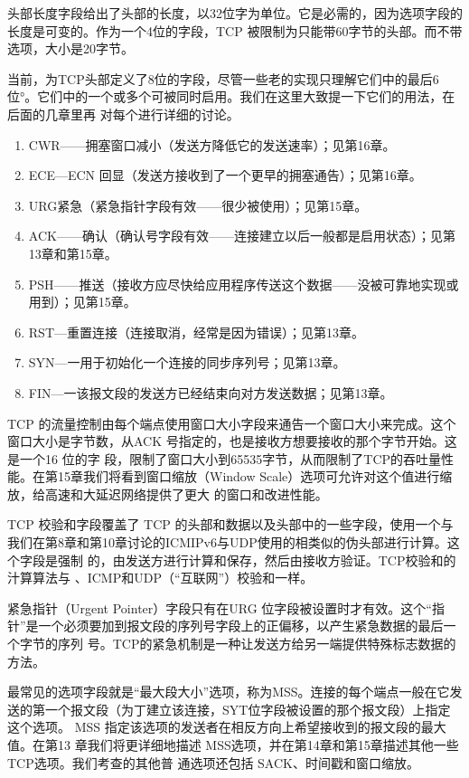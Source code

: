 头部长度字段给出了头部的长度，以32位字为单位。它是必需的，因为选项字段的长度是可变的。作为一个4位的字段，TCP 被限制为只能带60字节的头部。而不带选项，大小是20字节。

当前，为TCP头部定义了8位的字段，尽管一些老的实现只理解它们中的最后6位°。它们中的一个或多个可被同时启用。我们在这里大致提一下它们的用法，在后面的几章里再
对每个进行详细的讨论。

\begin{enumerate}
    \item CWR——拥塞窗口减小（发送方降低它的发送速率）；见第16章。
    \item ECE—ECN 回显（发送方接收到了一个更早的拥塞通告）；见第16章。
    \item URG紧急（紧急指针字段有效——很少被使用）；见第15章。
    \item ACK——确认（确认号字段有效——连接建立以后一般都是启用状态）；见第13章和第15章。
    \item PSH——推送（接收方应尽快给应用程序传送这个数据——没被可靠地实现或用到）；见第15章。
    \item RST—重置连接（连接取消，经常是因为错误）；见第13章。
    \item SYN—一用于初始化一个连接的同步序列号；见第13章。
    \item FIN—一该报文段的发送方已经结束向对方发送数据；见第13章。
\end{enumerate}
TCP 的流量控制由每个端点使用窗口大小字段来通告一个窗口大小来完成。这个窗口大小是字节数，从ACK 号指定的，也是接收方想要接收的那个字节开始。这是一个16 位的字
段，限制了窗口大小到65535字节，从而限制了TCP的吞吐量性能。在第15章我们将看到窗口缩放（Window Scale）选项可允许对这个值进行缩放，给高速和大延迟网络提供了更大
的窗口和改进性能。

TCP 校验和字段覆盖了 TCP 的头部和数据以及头部中的一些字段，使用一个与我们在第8章和第10章讨论的ICMIPv6与UDP使用的相类似的伪头部进行计算。这个字段是强制
的，由发送方进行计算和保存，然后由接收方验证。TCP校验和的汁算算法与 、ICMP和UDP（“互联网”）校验和一样。

紧急指针（Urgent Pointer）字段只有在URG 位字段被设置时才有效。这个“指针”是一个必须要加到报文段的序列号字段上的正偏移，以产生紧急数据的最后一个字节的序列
号。TCP的紧急机制是一种让发送方给另一端提供特殊标志数据的方法。

最常见的选项字段就是“最大段大小”选项，称为MSS。连接的每个端点一般在它发送的第一个报文段（为丁建立该连接，SYT位字段被设置的那个报文段）上指定这个选项。
MSS 指定该选项的发送者在相反方向上希望接收到的报文段的最大值。在第13 章我们将更详细地描述 MSS选项，并在第14章和第15章描述其他一些TCP选项。我们考查的其他普
通选项还包括 SACK、时间戳和窗口缩放。

